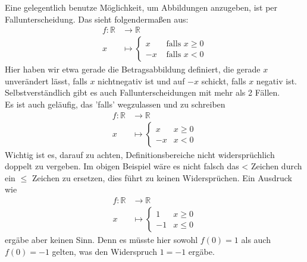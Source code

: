 \begin{bem}
	Eine gelegentlich benutze Möglichkeit, um Abbildungen anzugeben, ist per Fallunterscheidung. Das sieht folgendermaßen aus:
	\begin{align*}
		f:\mathbb{R} &\to \mathbb{R} \\
		x &\mapsto \left \{ \begin{array}{ll}
		x &\text{ falls } x \geq 0\\
		-x	&\text{ falls } x < 0
		\end{array}	
			 \right.
	\end{align*}
Hier haben wir etwa gerade die Betragsabbildung definiert, die gerade $x$ unverändert lässt, falls $x$ nichtnegativ ist und auf $-x$ schickt, falls $x$ negativ ist. \\
Selbstverständlich gibt es auch Fallunterscheidungen mit mehr als 2 Fällen. \\
Es ist auch geläufig, das 'falls' wegzulassen und zu schreiben
\begin{align*}
	f:\mathbb{R} &\to \mathbb{R} \\
	x &\mapsto \left \{ \begin{array}{ll}
		x & x \geq 0\\
		-x	& x < 0
	\end{array}	
	\right.
\end{align*}
Wichtig ist es, darauf zu achten, Definitionsbereiche nicht widersprüchlich doppelt zu vergeben. Im obigen Beispiel wäre es nicht falsch das \dq  < \dq Zeichen durch ein \dq $\leq$ \dq Zeichen zu ersetzen, dies führt zu keinen Widersprüchen. Ein Ausdruck wie
\begin{align*}
	f:\mathbb{R} &\to \mathbb{R} \\
	x &\mapsto \left \{ \begin{array}{ll}
		1  &x \geq 0\\
		-1 &x \leq 0
	\end{array}	
	\right.
\end{align*}
ergäbe aber keinen Sinn. Denn es müsste hier sowohl $f(0)=1$ als auch $f(0)=-1$ gelten, was den Widerspruch $1=-1$ ergäbe.
\end{bem}		


